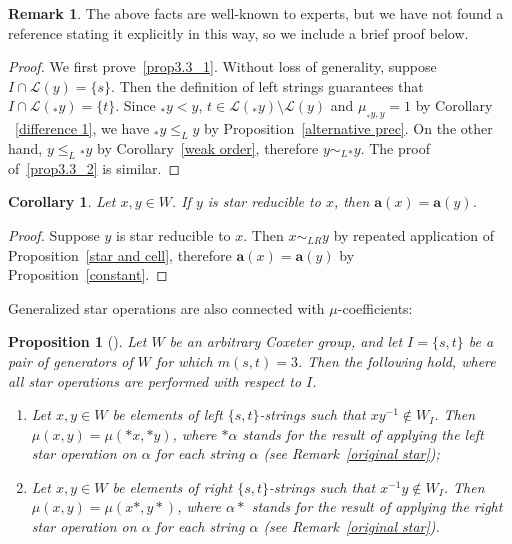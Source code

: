 \documentclass[10pt]{article}
\newtheorem{prop}[theorem]{Proposition}
\newtheorem{coro}[theorem]{Corollary}
\theoremstyle{definition}
\newtheorem{rema}[theorem]{Remark}
\newcommand{\la}{\mathbf{a}}
\begin{document}
 \begin{rema}
 The above facts are well-known to experts, but we have
 not found a reference stating it explicitly in this way, so we include a
 brief proof below. 
 \end{rema}
 \begin{proof}
 We first prove~\eqref{prop3.3_1}. Without loss of generality, suppose $I\cap
 \mathcal{L}(y)=\{s\}$. Then the definition of left strings guarantees that
 $I\cap\mathcal{L}({}_*y)=\{t\}$. Since ${}_*y<y$, $t\in \mathcal{L}({}_*
 y)\setminus\mathcal{L}(y)$ and $\mu_{{}_*y,y}=1$ by Corollary
~\ref{difference 1}, we have ${}_* y\le_L y$ by Proposition~\ref{alternative
 prec}. On the other hand, $y\le_L {}_* y$ by Corollary~\ref{weak order},
 therefore $y\sim_L {}_* y$. The proof of~\eqref{prop3.3_2} is similar.
 \end{proof} 

 \begin{coro}
 \label{star a}
 Let $x,y\in W$. If $y$ is star reducible to $x$, then $\la(x)=\la(y)$.
 \end{coro}
 \begin{proof}
 Suppose $y$ is star reducible to $x$. Then $x\sim_{LR} y$ by repeated
 application of Proposition~\ref{star and cell}, therefore
 $\la(x)=\la(y)$ by Proposition~\ref{constant}.
 \end{proof}

 Generalized star operations are also connected with $\mu$-coefficients:

 \begin{prop}[{\cite[Theorem 4.2]{KL}}]
 \label{star and mu}
 Let $W$ be an arbitrary Coxeter group, and let $I=\{s,t\}$ be a pair of
 generators of $W$ for which $m(s,t)=3$. Then the following hold, where all
 star operations are performed with respect to $I$.
 \begin{enumerate}
 \item Let $x,y\in W$ be elements of left $\{s,t\}$-strings such that
 $xy^{-1}\notin W_I$. Then $\mu(x,y)=\mu(*x,*y)$, where $*\alpha$ stands for the
 result of applying the left star operation on $\alpha$ for each string
 $\alpha$ \textup{(}see Remark~\ref{original star}\textup{)};
 \item Let $x,y\in W$ be elements of right $\{s,t\}$-strings such that
 $x^{-1}y\notin W_I$. Then $\mu(x,y)=\mu(x*,y*)$, where $\alpha*$ stands for the
 result of applying the right star operation on $\alpha$ for each string
 $\alpha$ \textup{(}see Remark~\ref{original star}\textup{)}.
 \end{enumerate}

 \end{prop}
\end{document}
